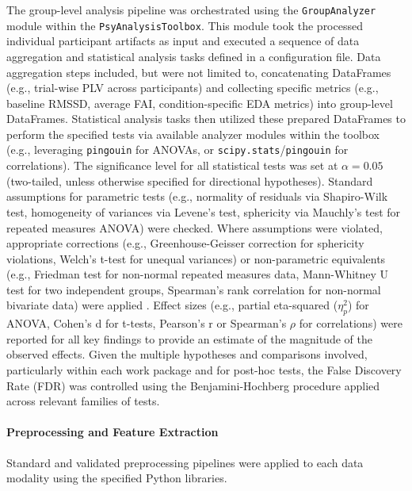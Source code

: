 The group-level analysis pipeline was orchestrated using the \texttt{GroupAnalyzer} module within the \texttt{PsyAnalysisToolbox}. This module took the processed individual participant artifacts as input and executed a sequence of data aggregation and statistical analysis tasks defined in a configuration file. Data aggregation steps included, but were not limited to, concatenating DataFrames (e.g., trial-wise PLV across participants) and collecting specific metrics (e.g., baseline RMSSD, average FAI, condition-specific EDA metrics) into group-level DataFrames. Statistical analysis tasks then utilized these prepared DataFrames to perform the specified tests via available analyzer modules within the toolbox (e.g., leveraging \texttt{pingouin} for ANOVAs, or \texttt{scipy.stats}/\texttt{pingouin} for correlations). The significance level for all statistical tests was set at $\alpha = 0.05$ (two-tailed, unless otherwise specified for directional hypotheses). Standard assumptions for parametric tests (e.g., normality of residuals via Shapiro-Wilk test, homogeneity of variances via Levene's test, sphericity via Mauchly's test for repeated measures \gls{ANOVA}) were checked. Where assumptions were violated, appropriate corrections (e.g., Greenhouse-Geisser correction for sphericity violations, Welch's t-test for unequal variances) or non-parametric equivalents (e.g., Friedman test for non-normal repeated measures data, Mann-Whitney U test for two independent groups, Spearman's rank correlation for non-normal bivariate data) were applied \parencite{fieldDiscoveringStatisticsUsing2024}. Effect sizes (e.g., partial eta-squared ($\eta_p^2$) for \gls{ANOVA}, Cohen's d for t-tests, Pearson's r or Spearman's $\rho$ for correlations) were reported for all key findings to provide an estimate of the magnitude of the observed effects. Given the multiple hypotheses and comparisons involved, particularly within each work package and for post-hoc tests, the False Discovery Rate (FDR) was controlled using the Benjamini-Hochberg procedure \parencite{benjaminControllingFalseDiscovery1995} applied across relevant families of tests.

\paragraph{Preprocessing and Feature Extraction}
Standard and validated preprocessing pipelines were applied to each data modality using the specified Python libraries.

